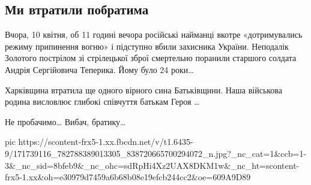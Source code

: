  
 
 
 
 

\subsection{Ми втратили побратима}

Вчора, 10 квітня, об 11 годині вечора російські найманці вкотре «дотримувались
режиму припинення вогню» і підступно вбили захисника України. Неподалік
Золотого пострілом зі стрілецької зброї смертельно поранили старшого солдата
Андрія Сергійовича Теперика. Йому було 24 роки…

Харківщина втратила ще одного вірного сина Батьківщини. Наша військова родина
висловлює глибокі співчуття батькам Героя …

Не пробачимо… Вибач, братику…

\ifcmt
  pic https://scontent-frx5-1.xx.fbcdn.net/v/t1.6435-9/171739116_782788389013305_838720665700294072_n.jpg?_nc_cat=1&ccb=1-3&_nc_sid=8bfeb9&_nc_ohc=sdRpHi4Xz2UAX8DKM1w&_nc_ht=scontent-frx5-1.xx&oh=e30979d7459a6b68b08e19efcb244cc2&oe=609A9D89
\fi

